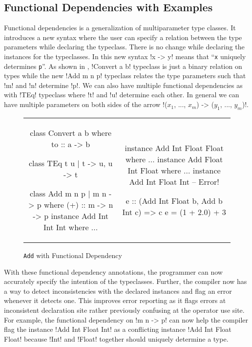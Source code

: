 \documentclass[format=sigplan,manuscript,review,screen, nonacm]{acmart}
\begin{document}
\subsection{Functional Dependencies with Examples}
Functional dependencies\cite{jones_tcfd_2000} is a generalization of multiparameter type classes.
It introduces a new syntax where the user can specify a relation between the type parameters
while declaring the typeclass. There is no change while declaring the instances for the typeclasses.
In this new syntax !x -> y! means that ``\texttt{x} uniquely determines \texttt{p}''.
As shown in , !Convert a b! typeclass is just a binary relation on types while 
the new !Add m n p! typeclass relates the type parameters such that !m! and !n! determine !p!.
We can also have multiple functional dependencies as with !TEq! typeclass where !t! and !u! determine
each other. In general we can have multiple parameters on both sides of the arrow !($x_1$, ..., $x_m$) -> ($y_1$, ..., $y_m$)!.

\begin{figure}[h t]
  \begin{tabular}{c c}
    \begin{code}
      class Convert a b where
         to :: a -> b

      class TEq t u | t -> u, u -> t

      class Add m n p | m n -> p where
        (+) :: m -> n -> p
      instance Add Int Int Int where
         ... 
    \end{code}&%
    \begin{code}
      instance Add Int Float Float where
         ...
      instance Add Float Int Float where
         ...
      instance Add Int Float Int -- Error!

      e :: (Add Int Float b, Add b Int c) => c
      e = (1 + 2.0) + 3 
    \end{code}
  \end{tabular}
  \caption{\texttt{Add} with Functional Dependency}
  \label{fig:tc-fd}
\end{figure}

With these functional dependency annotations, the programmer
can now accurately specify the intention of the typeclasses.
Further, the compiler now has a way to detect inconsistencies with
the declared instances and flag an error whenever it detects one.
This improves error reporting as it flags errors at inconsistent declaration site
rather previously confusing at the operator use site. For example,
the functional dependency on !m n -> p! can now help the compiler flag
the instance !Add Int Float Int! as a conflicting instance
!Add Int Float Float! because !Int! and !Float! together should uniquely determine a type.
\end{document}
